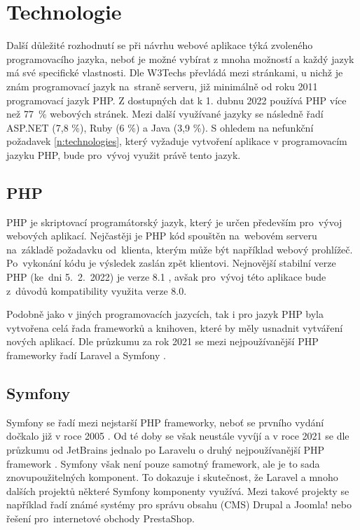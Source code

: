 \section{Technologie}
Další důležité rozhodnutí se při návrhu webové aplikace týká zvoleného programovacího jazyka, neboť je možné vybírat z mnoha možností a každý jazyk má své specifické vlastnosti. Dle W3Techs převládá mezi stránkami, u nichž je znám programovací jazyk na~straně serveru, již minimálně od roku 2011 programovací jazyk PHP. Z dostupných dat k 1. dubnu 2022 používá PHP více než 77~\% webových stránek. Mezi další využívané jazyky se následně řadí ASP.NET (7,8 \%), Ruby (6 \%) a Java (3,9 \%). \cite{php_w3techs} S ohledem na nefunkční požadavek \ref{n:technologies}, který vyžaduje vytvoření aplikace v programovacím jazyku PHP, bude pro~vývoj využit právě tento jazyk.

\subsection{PHP}
 PHP je skriptovací programátorský jazyk, který je určen především pro~vývoj webových aplikací. Nejčastěji je PHP kód spouštěn na~webovém serveru na~základě požadavku od~klienta, kterým může být například webový prohlížeč. Po~vykonání kódu je výsledek zaslán zpět klientovi. \cite{php_intro_1, php_intro_2} Nejnovější stabilní verze PHP (ke~dni 5.~2.~2022) je verze 8.1 \cite{php_version}, avšak pro~vývoj této aplikace bude z~důvodů kompatibility využita verze 8.0.
 
 Podobně jako v jiných programovacích jazycích, tak i pro jazyk PHP byla vytvořena celá řada frameworků a knihoven, které by měly usnadnit vytváření nových aplikací. Dle průzkumu za rok 2021 se mezi nejpoužívanější PHP frameworky řadí Laravel a Symfony \cite{php_jetbrains}.
 
\subsection{Symfony}
Symfony se řadí mezi nejstarší PHP frameworky, neboť se prvního vydání dočkalo již v roce 2005 \cite{symfony_legacy}. Od té doby se však neustále vyvíjí a v roce 2021 se dle průzkumu od JetBrains jednalo po Laravelu o druhý nejpoužívanější PHP framework \cite{php_jetbrains}. Symfony však není pouze samotný framework, ale je to sada znovupoužitelných komponent. To dokazuje i skutečnost, že Laravel a mnoho dalších projektů některé Symfony komponenty využívá. Mezi takové projekty se například řadí známé systémy pro správu obsahu (CMS) Drupal a Joomla! nebo řešení pro~internetové obchody PrestaShop. \cite{symfony_projects}

